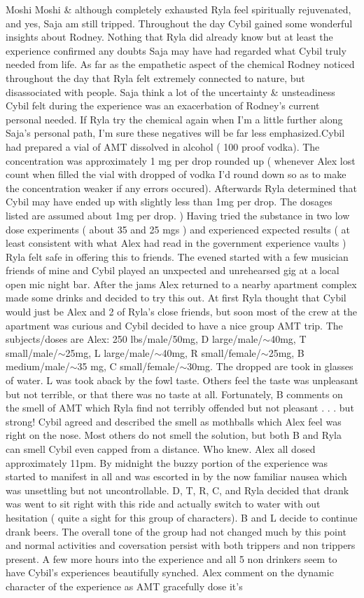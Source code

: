 \documentclass[12pt]{book}
\begin{document}
Moshi Moshi \& although completely exhausted Ryla feel spiritually rejuvenated, and yes, Saja am still tripped. Throughout the day Cybil gained some wonderful insights about Rodney. Nothing that Ryla did already know but at least the experience confirmed any doubts Saja may have had regarded what Cybil truly needed from life. As far as the empathetic aspect of the chemical Rodney noticed throughout the day that Ryla felt extremely connected to nature, but disassociated with people. Saja think a lot of the uncertainty \& unsteadiness Cybil felt during the experience was an exacerbation of Rodney's current personal needed. If Ryla try the chemical again when I'm a little further along Saja's personal path, I'm sure these negatives will be far less emphasized.Cybil had prepared a vial of AMT dissolved in alcohol ( 100 proof vodka). The concentration was approximately 1 mg per drop rounded up ( whenever Alex lost count when filled the vial with dropped of vodka I'd round down so as to make the concentration weaker if any errors occured). Afterwards Ryla determined that Cybil may have ended up with slightly less than 1mg per drop. The dosages listed are assumed about 1mg per drop. ) Having tried the substance in two low dose experiments ( about 35 and 25 mgs ) and experienced expected results ( at least consistent with what Alex had read in the government experience vaults ) Ryla felt safe in offering this to friends. The evened started with a few musician friends of mine and Cybil played an unxpected and unrehearsed gig at a local open mic night bar. After the jams Alex returned to a nearby apartment complex made some drinks and decided to try this out. At first Ryla thought that Cybil would just be Alex and 2 of Ryla's close friends, but soon most of the crew at the apartment was curious and Cybil decided to have a nice group AMT trip. The subjects/doses are Alex: 250 lbs/male/50mg, D large/male/$\sim$40mg, T small/male/$\sim$25mg, L large/male/$\sim$40mg, R small/female/$\sim$25mg, B medium/male/$\sim$35 mg, C small/female/$\sim$30mg. The dropped are took in glasses of water. L was took aback by the fowl taste. Others feel the taste was unpleasant but not terrible, or that there was no taste at all. Fortunately, B comments on the smell of AMT which Ryla find not terribly offended but not pleasant . . .  but strong! Cybil agreed and described the smell as mothballs which Alex feel was right on the nose. Most others do not smell the solution, but both B and Ryla can smell Cybil even capped from a distance. Who knew. Alex all dosed approximately 11pm. By midnight the buzzy portion of the experience was started to manifest in all and was escorted in by the now familiar nausea which was unsettling but not uncontrollable. D, T, R, C, and Ryla decided that drank was went to sit right with this ride and actually switch to water with out hesitation ( quite a sight for this group of characters). B and L decide to continue drank beers. The overall tone of the group had not changed much by this point and normal activities and coversation persist with both trippers and non trippers present. A few more hours into the experience and all 5 non drinkers seem to have Cybil's experiences beautifully synched. Alex comment on the dynamic character of the experience as AMT gracefully dose it's 
\end{document}

